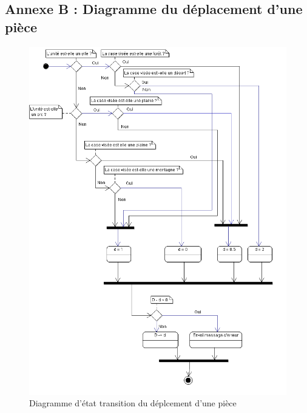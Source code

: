 \subsection{Annexe B : Diagramme du déplacement d'une pièce}
\begin{figure}[!h]
\centering
\includegraphics[scale=0.65]{img/Deplacement.png}
\caption{Diagramme d'état transition du déplcement d'une pièce}
\end{figure}
\clearpage

